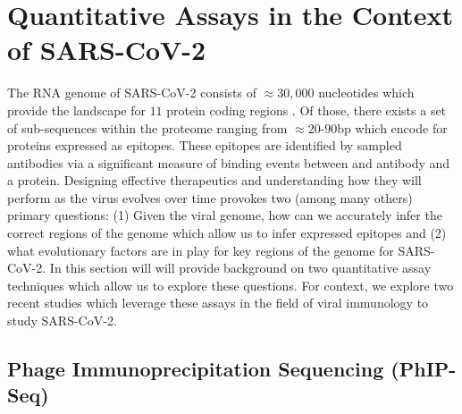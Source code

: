 \documentclass{article}
\begin{document}
\section*{Quantitative Assays in the Context of SARS-CoV-2}

The RNA genome of SARS-CoV-2 consists of $\approx 30,000$ nucleotides which provide the landscape for $11$ protein coding regions \citep{Naqvi2020}.
Of those, there exists a set of sub-sequences within the proteome ranging from $\approx 20$-$90$bp which encode for proteins expressed as epitopes. 
These epitopes are identified by sampled antibodies via a significant measure of binding events between and antibody and a protein.
Designing effective therapeutics and understanding how they will perform as the virus evolves over time provokes two (among many others) primary questions:
(1) Given the viral genome, how can we accurately infer the correct regions of the genome which allow us to infer expressed epitopes and
(2) what evolutionary factors are in play for key regions of the genome for SARS-CoV-2.
In this section will will provide background on two quantitative assay techniques which allow us to explore these questions.
For context, we explore two recent studies which leverage these assays in the field of viral immunology to study SARS-CoV-2.


\subsection*{Phage Immunoprecipitation Sequencing (PhIP-Seq)}
\end{document}
